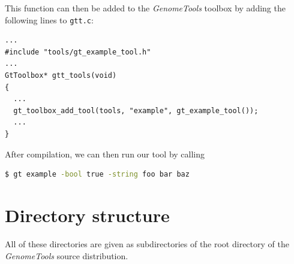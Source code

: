 \documentclass[11pt,final]{article}
\newcommand{\keyword}[1]{\lstinline{#1}}
\newcommand{\Gt}[0]{\emph{GenomeTools}\xspace}
\begin{document}
This function can then be added to the \Gt toolbox by adding the following lines
to \keyword{gtt.c}:

\begin{lstlisting}
...
#include "tools/gt_example_tool.h"
...
GtToolbox* gtt_tools(void)
{
  ...
  gt_toolbox_add_tool(tools, "example", gt_example_tool());
  ...
}
\end{lstlisting}

After compilation, we can then run our tool by calling

\begin{lstlisting}[language=sh]
$ gt example -bool true -string foo bar baz
\end{lstlisting}%

\section{Directory structure}
All of these directories are given as subdirectories of the root directory of
the \Gt source distribution. 
\end{document}

